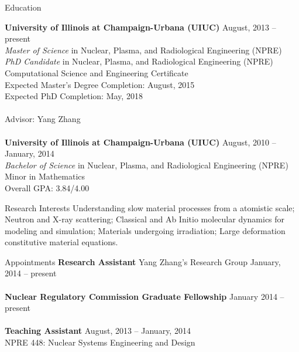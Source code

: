 \documentclass{resume} %
\begin{document}

\begin{rSection}{Education}

{\bf University of Illinois at Champaign-Urbana (UIUC)} \hfill {August, 2013 -- present} \\
{\it{Master of Science}} in Nuclear, Plasma, and Radiological Engineering (NPRE) \\
{\it{PhD Candidate}} in Nuclear, Plasma, and Radiological Engineering (NPRE) \\
Computational Science and Engineering Certificate \\
Expected Master's Degree Completion: August, 2015 \\
Expected PhD Completion: May, 2018\\
\\
Advisor: Yang Zhang
\\
\\
{\bf University of Illinois at Champaign-Urbana (UIUC)} \hfill { August, 2010 -- January, 2014} \\ 
{\it Bachelor of Science} in Nuclear, Plasma, and Radiological Engineering (NPRE) \\
Minor in Mathematics \\
Overall GPA: 3.84/4.00
\smallskip \\


\end{rSection}

\begin{rSection}{Research Interests}
	Understanding slow material processes from a atomistic scale; Neutron and X-ray scattering; Classical and Ab Initio molecular dynamics for modeling and simulation; Materials undergoing irradiation; Large deformation constitutive material equations.
	\\
\end{rSection}


\begin{rSection}{Appointments}
	{\bf Research Assistant} Yang Zhang's Research Group \hfill {January, 2014 -- present} 
	\\
	\\
	{\bf Nuclear Regulatory Commission Graduate Fellowship} \hfill {January 2014 -- present}
	\\
	\\
	{\bf Teaching Assistant} \hfill {August, 2013 -- January, 2014} \\
	NPRE 448: Nuclear Systems Engineering and Design
	\\
\end{rSection}
\end{document}
